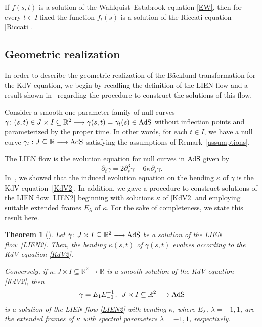 \documentclass[10pt,a4paper]{amsart}
\numberwithin{equation}{section}
\newtheorem{Theorem}{Theorem}[section]
\def\bending{\kappa}
\def\R{\mathbb{R}}
\def\AdS{{\rm AdS}}
\begin{document}
\begin{Remark}\label{WE-R}
	If $f(s,t)$ is a solution of the Wahlquist--Estabrook equation \eqref{EW}, then for every $t\in I$ fixed the function $f_t(s)$ is a solution of the Riccati equation \eqref{Riccati}.
\end{Remark}

\subsection{Geometric realization}

In order to describe the geometric realization of the B\"{a}cklund transformation for the KdV equation, we begin by recalling the definition of the LIEN flow and a result shown in~\cite{MP} regarding the procedure to construct the solutions of this flow.

Consider a smooth one parameter family of null curves $\gamma\colon (s,t)\in J\times I\subseteq\R^2\longmapsto \gamma(s,t)=\gamma_t(s)\in\AdS$ without inflection points and parameterized by the proper time. In other words, for each $t\in I$, we have a null curve $\gamma_t:J\subseteq\R\longrightarrow\AdS$ satisfying the assumptions of Remark~\ref{assumptions}.

The LIEN flow is the evolution equation for null curves in $\AdS$ given by
\begin{equation}\label{LIEN2}
	\partial_t\gamma=2\partial_s^3\gamma-6\bending\partial_s\gamma.
\end{equation}
In~\cite{MP}, we showed that the induced evolution equation on the bending $\bending$ of $\gamma$ is the KdV equation~\eqref{KdV2}. In addition, we gave a procedure to construct solutions of the LIEN flow \eqref{LIEN2} beginning with solutions $\bending$ of \eqref{KdV2} and employing suitable extended frames $E_\lambda$ of $\bending$. For the sake of completeness, we state this result here.

\begin{Theorem}[{\cite[Theorem 4.2]{MP}}]\label{induced}
	Let $\gamma\colon J\times I\subseteq\R^2\longrightarrow\AdS$ be a solution of the LIEN flow~\eqref{LIEN2}. Then, the bending $\bending(s,t)$ of $\gamma(s,t)$ evolves according to the KdV equation \eqref{KdV2}.
	
	Conversely, if $\bending\colon J\times I\subseteq\R^2\longrightarrow\R$ is a smooth solution of the KdV equation \eqref{KdV2}, then
	\begin{equation*}%
		\gamma=E_1E_{-1}^{-1}\colon\ J\times I\subseteq\R^2\longrightarrow\AdS
	\end{equation*}
	is a solution of the LIEN flow \eqref{LIEN2} with bending $\bending$, where $E_\lambda$, $\lambda=-1,1$, are the extended frames of $\bending$ with spectral parameters $\lambda=-1,1$, respectively.
\end{Theorem}
\end{document}
